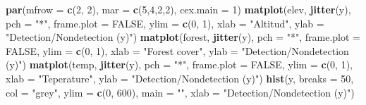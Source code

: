 \documentclass[]{book}
\newenvironment{Shaded}{\begin{snugshade}}{\end{snugshade}}
\newcommand{\KeywordTok}[1]{\textcolor[rgb]{0.13,0.29,0.53}{\textbf{{#1}}}}
\newcommand{\DataTypeTok}[1]{\textcolor[rgb]{0.13,0.29,0.53}{{#1}}}
\newcommand{\DecValTok}[1]{\textcolor[rgb]{0.00,0.00,0.81}{{#1}}}
\newcommand{\StringTok}[1]{\textcolor[rgb]{0.31,0.60,0.02}{{#1}}}
\newcommand{\OtherTok}[1]{\textcolor[rgb]{0.56,0.35,0.01}{{#1}}}
\newcommand{\NormalTok}[1]{{#1}}
\begin{document}
\begin{Shaded}
\begin{Highlighting}[]
\KeywordTok{par}\NormalTok{(}\DataTypeTok{mfrow =} \KeywordTok{c}\NormalTok{(}\DecValTok{2}\NormalTok{, }\DecValTok{2}\NormalTok{), }\DataTypeTok{mar =} \KeywordTok{c}\NormalTok{(}\DecValTok{5}\NormalTok{,}\DecValTok{4}\NormalTok{,}\DecValTok{2}\NormalTok{,}\DecValTok{2}\NormalTok{), }\DataTypeTok{cex.main =} \DecValTok{1}\NormalTok{)}
\KeywordTok{matplot}\NormalTok{(elev, }\KeywordTok{jitter}\NormalTok{(y), }\DataTypeTok{pch =} \StringTok{"*"}\NormalTok{, }\DataTypeTok{frame.plot =} \OtherTok{FALSE}\NormalTok{, }\DataTypeTok{ylim =} \KeywordTok{c}\NormalTok{(}\DecValTok{0}\NormalTok{, }\DecValTok{1}\NormalTok{), }
        \DataTypeTok{xlab =} \StringTok{"Altitud"}\NormalTok{, }\DataTypeTok{ylab =} \StringTok{"Detection/Nondetection (y)"}\NormalTok{)}
\KeywordTok{matplot}\NormalTok{(forest, }\KeywordTok{jitter}\NormalTok{(y), }\DataTypeTok{pch =} \StringTok{"*"}\NormalTok{, }\DataTypeTok{frame.plot =} \OtherTok{FALSE}\NormalTok{, }\DataTypeTok{ylim =} \KeywordTok{c}\NormalTok{(}\DecValTok{0}\NormalTok{, }\DecValTok{1}\NormalTok{), }
        \DataTypeTok{xlab =} \StringTok{"Forest cover"}\NormalTok{, }\DataTypeTok{ylab =} \StringTok{"Detection/Nondetection (y)"}\NormalTok{)}
\KeywordTok{matplot}\NormalTok{(temp, }\KeywordTok{jitter}\NormalTok{(y), }\DataTypeTok{pch =} \StringTok{"*"}\NormalTok{, }\DataTypeTok{frame.plot =} \OtherTok{FALSE}\NormalTok{, }\DataTypeTok{ylim =} \KeywordTok{c}\NormalTok{(}\DecValTok{0}\NormalTok{, }\DecValTok{1}\NormalTok{), }
        \DataTypeTok{xlab =} \StringTok{"Teperature"}\NormalTok{, }\DataTypeTok{ylab =} \StringTok{"Detection/Nondetection (y)"}\NormalTok{)}
\KeywordTok{hist}\NormalTok{(y, }\DataTypeTok{breaks =} \DecValTok{50}\NormalTok{, }\DataTypeTok{col =} \StringTok{"grey"}\NormalTok{, }\DataTypeTok{ylim =} \KeywordTok{c}\NormalTok{(}\DecValTok{0}\NormalTok{, }\DecValTok{600}\NormalTok{), }\DataTypeTok{main =} \StringTok{""}\NormalTok{, }
     \DataTypeTok{xlab =} \StringTok{"Detection/Nondetection (y)"}\NormalTok{)}
\end{Highlighting}
\end{Shaded}
\end{document}
